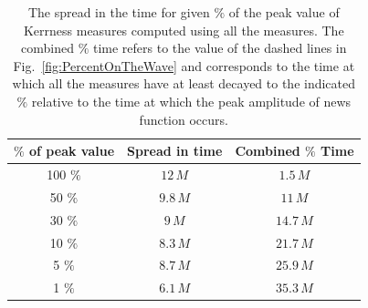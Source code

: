 \begin{table}[!htb]
 \begin{ruledtabular}
    \centering
        \begin{tabular}{ c| c | c}
$\%$ of peak value & Spread in time & Combined $\%$ Time \\ \hline
100 $\%$ & $12\,M$ & $1.5\,M$ \\
50 $\%$ & $9.8\,M$ & $11\,M$ \\
30 $\%$ & $9\,M$ & $14.7\,M$ \\
10 $\%$ & $8.3\,M$ & $21.7\,M$ \\
5 $\%$ & $8.7\,M$ & $25.9\,M$ \\
1 $\%$ & $6.1\,M$ & $35.3\,M$
\end{tabular}
    \caption{The spread in the time for given $\%$ of the peak value of Kerrness measures computed using all the measures. The combined $\%$ time refers to the value of the dashed lines in  Fig.~\ref{fig:PercentOnTheWave} and corresponds to the time at which all the measures have at least decayed to the indicated $\%$ relative to the time at which the peak amplitude of news function occurs. }
\label{tab:percentageDecrease}
 \end{ruledtabular}
\end{table}



